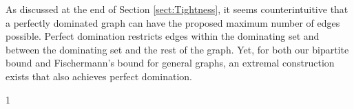 \documentclass[12pt]{amsart}
\begin{document}
As discussed at the end of Section \ref{sect:Tightness}, it seems counterintuitive that a perfectly dominated graph can have the proposed maximum number of edges possible. Perfect domination restricts edges within the dominating set and between the dominating set and the rest of the graph. Yet, for both our bipartite bound and Fischermann's bound for general graphs, an extremal construction exists that also achieves perfect domination.
\newpage
\begin{spacing}{1}


\end{spacing}
\end{document}
